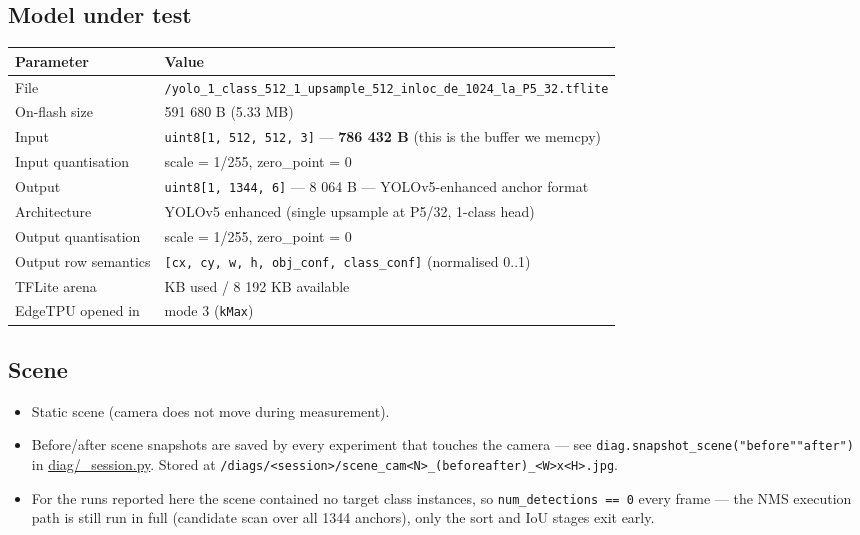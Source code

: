 \subsection{Model under test}\label{model-under-test}

{\def\LTcaptype{none} %
\begin{longtable}[]{@{}
  >{\raggedright\arraybackslash}p{}
  >{\raggedright\arraybackslash}p{}@{}}
\toprule\noalign{}
\begin{minipage}[b]{\linewidth}\raggedright
Parameter
\end{minipage} & \begin{minipage}[b]{\linewidth}\raggedright
Value
\end{minipage} \\
\midrule\noalign{}
\endhead
\bottomrule\noalign{}
\endlastfoot
File &
\texttt{/yolo\_1\_class\_512\_1\_upsample\_512\_inloc\_de\_1024\_la\_P5\_32.tflite} \\
On-flash size & 5 591 680 B (5.33 MB) \\
Input & \texttt{uint8{[}1,\ 512,\ 512,\ 3{]}} --- \textbf{786 432 B}
(this is the buffer we memcpy) \\
Input quantisation & scale = 1/255, zero\_point = 0 \\
Output & \texttt{uint8{[}1,\ 1344,\ 6{]}} --- 8 064 B ---
YOLOv5-enhanced anchor format \\
Architecture & YOLOv5 enhanced (single upsample at P5/32, 1-class
head) \\
Output quantisation & scale = 1/255, zero\_point = 0 \\
Output row semantics &
\texttt{{[}cx,\ cy,\ w,\ h,\ obj\_conf,\ class\_conf{]}} (normalised
0..1) \\
TFLite arena & 799 KB used / 8 192 KB available \\
EdgeTPU opened in & mode 3 (\texttt{kMax}) \\
\end{longtable}
}

\subsection{Scene}\label{scene}

\begin{itemize}
\tightlist
\item
  Static scene (camera does not move during measurement).
\item
  Before/after scene snapshots are saved by every experiment that
  touches the camera --- see
  \texttt{diag.snapshot\_scene("before"\textbar{}"after")} in
  \href{../diag/_session.py}{diag/\_session.py}. Stored at
  \texttt{/diags/\textless{}session\textgreater{}/scene\_cam\textless{}N\textgreater{}\_(before\textbar{}after)\_\textless{}W\textgreater{}x\textless{}H\textgreater{}.jpg}.
\item
  For the runs reported here the scene contained no target class
  instances, so \texttt{num\_detections\ ==\ 0} every frame --- the NMS
  execution path is still run in full (candidate scan over all 1344
  anchors), only the sort and IoU stages exit early.
\end{itemize}

